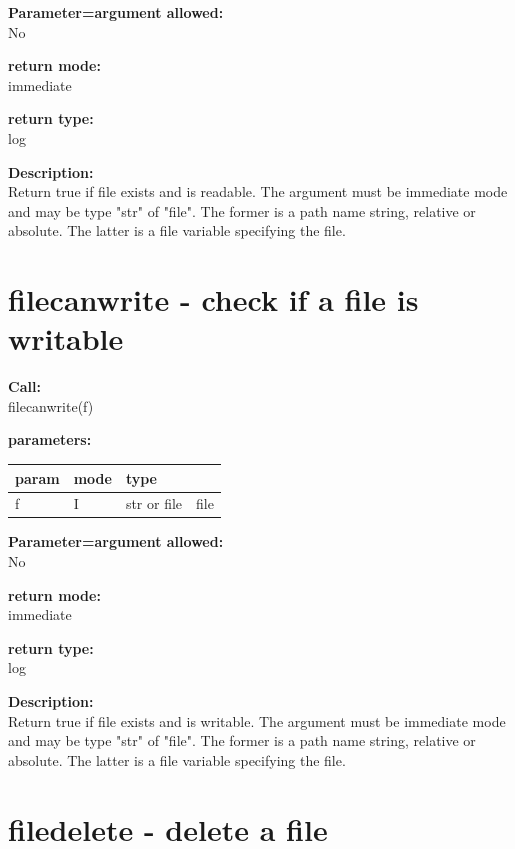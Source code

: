         {\bf Parameter=argument allowed:} \\
        No
        
        {\bf return mode:} \\
        immediate

        {\bf return type:} \\
        log
        
        {\bf Description:} \\
        Return true if file exists and is readable.
        The argument must be immediate mode and may be type "str"
        of "file". The former is a path name string, relative or absolute.
        The latter is a file variable specifying the file.
 


    \section{filecanwrite - check if a file is writable}\label{sec:iffilecanwrite}
        
        {\bf Call:} \\
        filecanwrite(f)
        
        {\bf parameters:} \\
        \begin{tabular}{| l | l | l | l |}
        \hline
        param  & mode & type & \\
        \hline \hline
        f & I & str or file & file \\ \hline
        \end{tabular}
        
        {\bf Parameter=argument allowed:} \\
        No
        
        {\bf return mode:} \\
        immediate

        {\bf return type:} \\
        log
        
        {\bf Description:} \\
        Return true if file exists and is writable.
        The argument must be immediate mode and may be type "str"
        of "file". The former is a path name string, relative or absolute.
        The latter is a file variable specifying the file.
 


    \section{filedelete - delete a file}\label{sec:iffiledelete}
        
